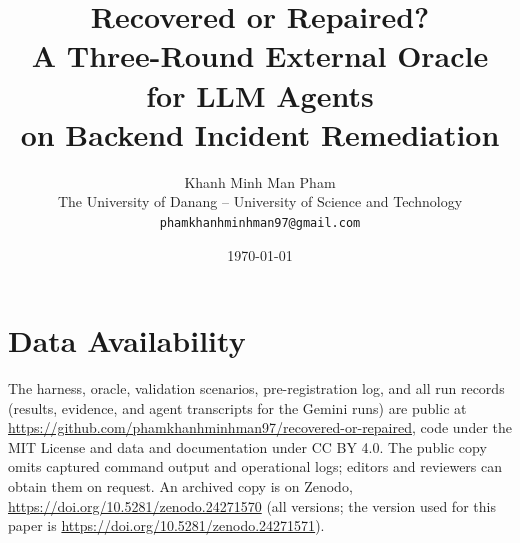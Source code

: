 \documentclass[11pt]{article}
\title{Recovered or Repaired?\\[2pt] A Three-Round External Oracle for LLM Agents\\on Backend Incident Remediation}
\author{Khanh Minh Man Pham\\
The University of Danang -- University of Science and Technology\\
\texttt{phamkhanhminhman97@gmail.com}}
\date{\today}
\begin{document}
\maketitle

\begin{abstract}

\end{abstract}



\section*{Data Availability}
The harness, oracle, validation scenarios, pre-registration log, and all run records (results, evidence, and agent
transcripts for the Gemini runs) are public at \url{https://github.com/phamkhanhminhman97/recovered-or-repaired}, code under the MIT License and data and
documentation under CC BY 4.0. The public copy omits captured command output and operational logs; editors and
reviewers can obtain them on request. An archived copy is on Zenodo, \url{https://doi.org/10.5281/zenodo.24271570} (all versions; the version used for this paper is \url{https://doi.org/10.5281/zenodo.24271571}).



\end{document}
